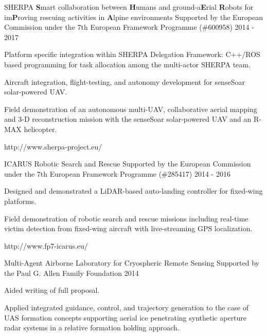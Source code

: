 \begin{cventries}
\cvprojwideentry
  	{SHERPA} %
  	{\textbf{S}mart collaboration between \textbf{H}umans and ground-a\textbf{E}rial \textbf{R}obots for im\textbf{P}roving rescuing activities in \textbf{A}lpine environments} %
    {Supported by the European Commission under the 7th European Framework Programme (\#600958)} %
    {2014 - 2017} %
    {
      \begin{cvitems} %
        \item {Platform specific integration within SHERPA Delegation Framework: C++/ROS based programming for task allocation among the multi-actor SHERPA team.}
        \item {Aircraft integration, flight-testing, and autonomy development for senseSoar solar-powered UAV.}
        \item {Field demonstration of an autonomous multi-UAV, collaborative aerial mapping and 3-D reconstruction mission with the senseSoar solar-powered UAV and an R-MAX helicopter.}
      \end{cvitems}
    } %
    {http://www.sherpa-project.eu/} %
    {\showprojectdescriptions}

\cvprojwideentry
  	{ICARUS} %
  	{Robotic Search and Rescue} %
    {Supported by the European Commission under the 7th European Framework Programme (\#285417)} %
    {2014 - 2016} %
    {
      \begin{cvitems} %
        \item {Designed and demonstrated a LiDAR-based auto-landing controller for fixed-wing platforms.}
        \item {Field demonstration of robotic search and rescue missions including real-time victim detection from fixed-wing aircraft with live-streaming GPS localization.}
      \end{cvitems}
    } %
    {http://www.fp7-icarus.eu/} %
    {\showprojectdescriptions}

\cvprojwideentry
  	{Multi-Agent Airborne Laboratory for Cryospheric Remote Sensing} %
  	{} %
    {Supported by the Paul G. Allen Family Foundation} %
    {2014} %
    {
      \begin{cvitems} %
        \item {Aided writing of full proposal.}
        \item {Applied integrated guidance, control, and trajectory generation to the case of UAS formation concepts supporting aerial ice penetrating synthetic aperture radar systems in a relative formation holding approach.}
      \end{cvitems}
    } %
    {} %
    {\showprojectdescriptions}
    

\end{cventries}
